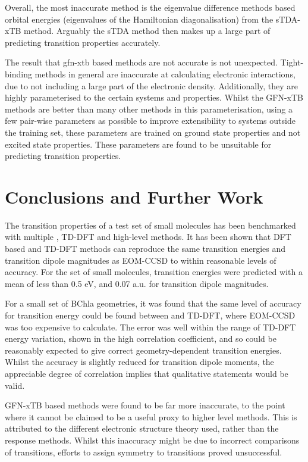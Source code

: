 Overall, the most inaccurate method is the eigenvalue difference methods based
orbital energies (eigenvalues of the Hamiltonian diagonalisation) from the sTDA-xTB
method. Arguably the sTDA method then makes up a large part of predicting transition 
properties accurately.

The result that gfn-xtb based methods are not accurate is not unexpected. Tight-binding
methods in general are inaccurate at calculating electronic interactions, due to not
including a large part of the electronic density. Additionally, they are highly
parameterised to the certain systems and properties. Whilst the GFN-xTB methods are
better than many other methods in this parameterisation, using a few pair-wise
parameters as possible to improve extensibility to systems outside the training
set, these parameters are trained on ground state properties and not excited state
properties. These parameters are found to be unsuitable for predicting transition
properties.

\section{Conclusions and Further Work}
The transition properties of a test set of small molecules has been benchmarked 
with multiple \dscf, TD-DFT and high-level methods. It has been shown that DFT 
based \dscf and TD-DFT methods can reproduce the same transition energies and 
transition dipole magnitudes as EOM-CCSD to within reasonable levels
of accuracy. For the set of small molecules, transition energies were predicted
with a mean of less than 0.5 eV, and 0.07 a.u. for transition dipole magnitudes.

For a small set of BChla geometries, it was found that the same level of accuracy
for transition energy could be found between \dscf and TD-DFT, where EOM-CCSD was
too expensive to calculate. The error was well within the range of TD-DFT energy
variation, shown in the high correlation coefficient, and so \dscf could be reasonably
expected to give correct geometry-dependent transition energies. Whilst the accuracy
is slightly reduced for transition dipole moments, the appreciable degree of correlation
implies that qualitative statements would be valid.

GFN-xTB based \dscf methods were found to be far more inaccurate, to the point
where it cannot be claimed to be a useful proxy to higher level methods. This
is attributed to the different electronic structure theory used, rather than the
response methods. Whilst this inaccuracy might be due to incorrect comparisons
of transitions, efforts to assign symmetry to \dscf transitions proved unsuccessful. 

